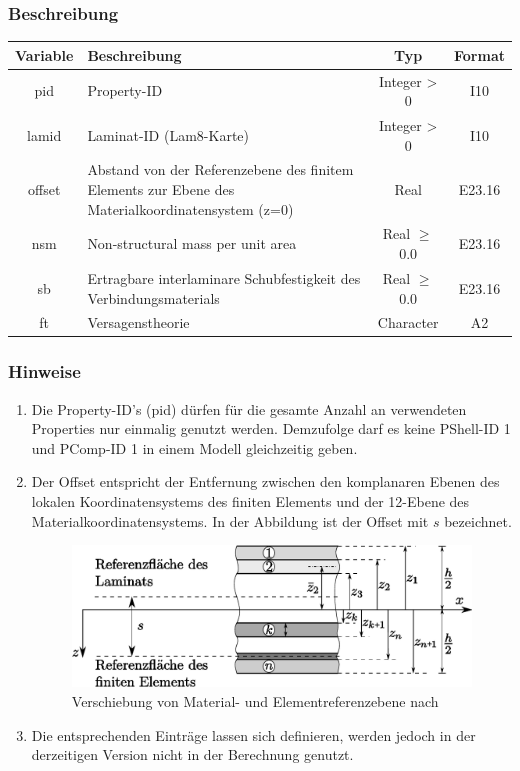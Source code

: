 \documentclass[11pt,titlepage,listof=totoc,bibliography=totoc,twoside]{scrreprt}
\begin{document}
{{\subsubsection{Beschreibung}

\begin{tabularx}{\textwidth}{cXcc}
\toprule
Variable& Beschreibung												& Typ			& Format\\
\midrule
pid	& Property-ID												& Integer > 0		& I10	\\
lamid	& Laminat-ID (Lam8-Karte)										& Integer > 0		& I10	\\
offset	& Abstand von der Referenzebene des finitem Elements zur Ebene des Materialkoordinatensystem (z=0)	& Real			& E23.16\\
nsm	& Non-structural mass per unit area									& Real $\ge$ 0.0	& E23.16\\
sb	& Ertragbare interlaminare Schubfestigkeit des Verbindungsmaterials					& Real $\ge$ 0.0	& E23.16\\
ft	& Versagenstheorie											& Character		& A2\\
\bottomrule
\end{tabularx}

\subsubsection{Hinweise}

\begin{enumerate}
\item Die Property-ID's (pid) dürfen für die gesamte Anzahl an verwendeten Properties nur einmalig genutzt werden. Demzufolge darf es keine PShell-ID 1 und PComp-ID 1 in einem Modell gleichzeitig geben.
\item Der Offset entspricht der Entfernung zwischen den komplanaren Ebenen des lokalen Koordinatensystems des finiten Elements und der 12-Ebene des Materialkoordinatensystems. In der Abbildung ist der Offset mit $s$ bezeichnet.
 		\begin{figure}[htb]
 		\centering
		\begin{center}
 		\includegraphics[scale=0.6]{Bilder/Laminatshift}
		\end{center}
 		\caption{Verschiebung von Material- und Elementreferenzebene nach \cite{Gei1999_p1} \label{Abb_Laminatshift}}
 		\end{figure}
\item Die entsprechenden Einträge lassen sich definieren, werden jedoch in der derzeitigen Version nicht in der Berechnung genutzt.
\end{enumerate}

}}
\end{document}
